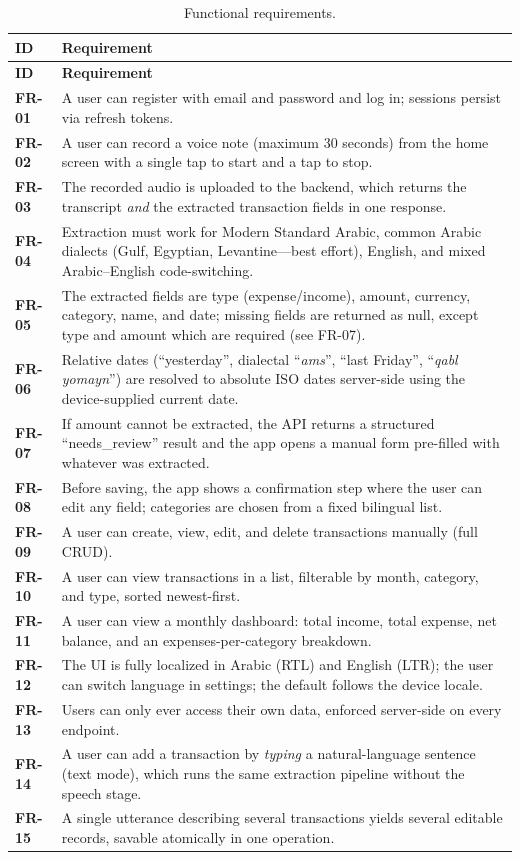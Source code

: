 \begin{longtable}{>{\bfseries}p{1.6cm} p{12.5cm}}
\caption{Functional requirements.}\label{tab:fr}\\
\toprule
\textbf{ID} & \textbf{Requirement} \\
\midrule
\endfirsthead
\toprule
\textbf{ID} & \textbf{Requirement} \\
\midrule
\endhead
\bottomrule
\endfoot
FR-01 & A user can register with email and password and log in; sessions persist via refresh tokens. \\
FR-02 & A user can record a voice note (maximum 30 seconds) from the home screen with a single tap to start and a tap to stop. \\
FR-03 & The recorded audio is uploaded to the backend, which returns the transcript \emph{and} the extracted transaction fields in one response. \\
FR-04 & Extraction must work for Modern Standard Arabic, common Arabic dialects (Gulf, Egyptian, Levantine---best effort), English, and mixed Arabic--English code-switching. \\
FR-05 & The extracted fields are type (expense/income), amount, currency, category, name, and date; missing fields are returned as null, except type and amount which are required (see FR-07). \\
FR-06 & Relative dates (``yesterday'', dialectal ``\emph{ams}'', ``last Friday'', ``\emph{qabl yomayn}'') are resolved to absolute ISO dates server-side using the device-supplied current date. \\
FR-07 & If amount cannot be extracted, the API returns a structured ``needs\_review'' result and the app opens a manual form pre-filled with whatever was extracted. \\
FR-08 & Before saving, the app shows a confirmation step where the user can edit any field; categories are chosen from a fixed bilingual list. \\
FR-09 & A user can create, view, edit, and delete transactions manually (full CRUD). \\
FR-10 & A user can view transactions in a list, filterable by month, category, and type, sorted newest-first. \\
FR-11 & A user can view a monthly dashboard: total income, total expense, net balance, and an expenses-per-category breakdown. \\
FR-12 & The UI is fully localized in Arabic (RTL) and English (LTR); the user can switch language in settings; the default follows the device locale. \\
FR-13 & Users can only ever access their own data, enforced server-side on every endpoint. \\
FR-14 & A user can add a transaction by \emph{typing} a natural-language sentence (text mode), which runs the same extraction pipeline without the speech stage. \\
FR-15 & A single utterance describing several transactions yields several editable records, savable atomically in one operation. \\
\end{longtable}

